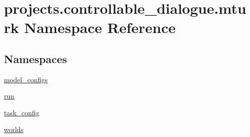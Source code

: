 \hypertarget{namespaceprojects_1_1controllable__dialogue_1_1mturk}{}\section{projects.\+controllable\+\_\+dialogue.\+mturk Namespace Reference}
\label{namespaceprojects_1_1controllable__dialogue_1_1mturk}
\subsection*{Namespaces}
\begin{DoxyCompactItemize}
\item 
 \hyperlink{namespaceprojects_1_1controllable__dialogue_1_1mturk_1_1model__configs}{model\+\_\+configs}
\item 
 \hyperlink{namespaceprojects_1_1controllable__dialogue_1_1mturk_1_1run}{run}
\item 
 \hyperlink{namespaceprojects_1_1controllable__dialogue_1_1mturk_1_1task__config}{task\+\_\+config}
\item 
 \hyperlink{namespaceprojects_1_1controllable__dialogue_1_1mturk_1_1worlds}{worlds}
\end{DoxyCompactItemize}
